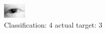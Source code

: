 \begin{figure}[h!]
\begin{center}
\includegraphics[width=0.60\columnwidth]{figures/ID38_class_4_target_3.png}
\end{center}
\caption{ Classification: 4 actual target: 3}
\label{fig:ID38_class_4_target_3}
\end{figure}
